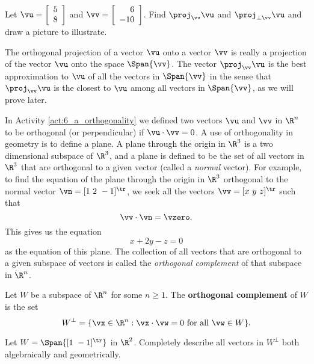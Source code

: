 \begin{activity} Let $\vu = \left[ \begin{array}{c} 5\\8 \end{array} \right]$ and $\vv = \left[ \begin{array}{r} 6\\-10 \end{array} \right]$. Find $\proj_{\vv} \vu$ and $\proj_{\perp \vv} \vu$ and draw a picture to illustrate.

\end{activity}

The orthogonal projection of a vector $\vu$ onto a vector $\vv$ is really a projection of the vector $\vu$ onto the space $\Span\{\vv\}$. The vector $\proj_{\vv} \vu$ is the best approximation to $\vu$ of all the vectors in $\Span\{\vv\}$ in the sense that $\proj_{\vv} \vu$ is the closest to $\vu$ among all vectors in $\Span\{\vv\}$, as we will prove later.

\label{sec:orthog_comp}

In Activity \ref{act:6_a_orthogonality} we defined two vectors $\vu$ and $\vv$ in $\R^n$ to be orthogonal (or perpendicular) if $\vu \cdot \vv = 0$. A use of orthogonality in geometry is to define a plane. A plane through the origin in $\R^3$ is a two dimensional subspace of $\R^3$, and a plane is defined to be the set of all vectors in $\R^3$ that are orthogonal to a given vector (called a \emph{normal} vector).  For example, to find the equation of the plane through the origin in $\R^3$ orthogonal to the normal vector $\vn = [1 \ 2 \ -1]^{\tr}$, we seek all the vectors $\vv = [x \  y \ z]^{\tr}$ such that
\[\vv \cdot \vn = \vzero.\]
This gives us the equation 
\[x+2y-z = 0\]
as the equation of this plane. The collection of all vectors that are orthogonal to a given subspace of vectors is called the \emph{orthogonal complement} of that subspace in $\R^n$.

\begin{definition} \label{def:6_a_orth_complement} Let $W$ be a subspace of $\R^n$ for some $n \geq 1$. The \textbf{orthogonal complement} of $W$ is the set
\[W^{\perp} = \{\vx \in \R^n : \vx \cdot \vw = 0 \text{ for all } \vw \in W\}.\]
\end{definition}

\begin{pa} \label{pa:6_a_2} Let $W = \Span\{[1 \ -1]^{\tr}\}$ in $\R^2$. Completely describe all vectors in $W^{\perp}$ both algebraically and geometrically.

\end{pa}


